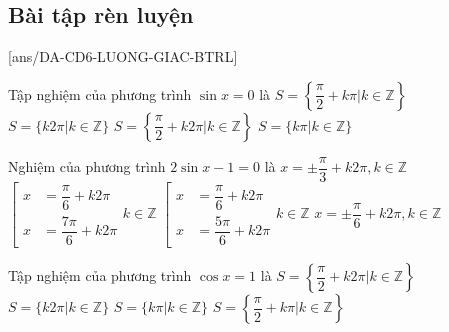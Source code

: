 \subsection{Bài tập rèn luyện}
[ans/DA-CD6-LUONG-GIAC-BTRL]
\begin{ex}[BGD-2025]
    Tập nghiệm của phương trình $\sin x = 0$ là
    \choice
    {$S = \left\{\dfrac{\pi}{2} + k\pi | k \in \mathbb{Z}\right\}$}
    {$S = \{k2\pi | k \in \mathbb{Z}\}$}
    {$S = \left\{\dfrac{\pi}{2} + k2\pi | k \in \mathbb{Z}\right\}$}
    {\True $S = \{k\pi | k \in \mathbb{Z}\}$}
\end{ex}
\begin{ex}Nghiệm của phương trình $2 \sin x - 1 = 0$ là
    \choice
    {$x = \pm \dfrac{\pi}{3} + k2\pi, k \in \mathbb{Z}$}
    {$\left[ \begin{aligned} x &= \dfrac{\pi}{6} + k2\pi \\ x &= \dfrac{7\pi}{6} + k2\pi \end{aligned} \right. k \in \mathbb{Z}$}
    {\True $\left[ \begin{aligned} x &= \dfrac{\pi}{6} + k2\pi \\ x &= \dfrac{5\pi}{6} + k2\pi \end{aligned} \right. k \in \mathbb{Z}$}
    {$x = \pm \dfrac{\pi}{6} + k2\pi, k \in \mathbb{Z}$}
    \loigiai{
        Ta có $2 \sin x - 1 = 0 \Leftrightarrow \sin x = \dfrac{1}{2} = \sin \dfrac{\pi}{6}$. \\
        $\Leftrightarrow \left[ \begin{aligned} x &= \dfrac{\pi}{6} + k2\pi \\ x &= \pi - \dfrac{\pi}{6} + k2\pi \end{aligned} \right. \Leftrightarrow \left[ \begin{aligned} x &= \dfrac{\pi}{6} + k2\pi \\ x &= \dfrac{5\pi}{6} + k2\pi \end{aligned} \right., k \in \mathbb{Z}$.
    }
\end{ex}
\begin{ex}
    Tập nghiệm của phương trình $\cos x = 1$ là
    \choice
    {$S = \left\{\dfrac{\pi}{2} + k2\pi | k \in \mathbb{Z}\right\}$}
    {\True $S = \{k2\pi | k \in \mathbb{Z}\}$}
    {$S = \{k\pi | k \in \mathbb{Z}\}$}
    {$S = \left\{\dfrac{\pi}{2} + k\pi | k \in \mathbb{Z}\right\}$}
\end{ex}
